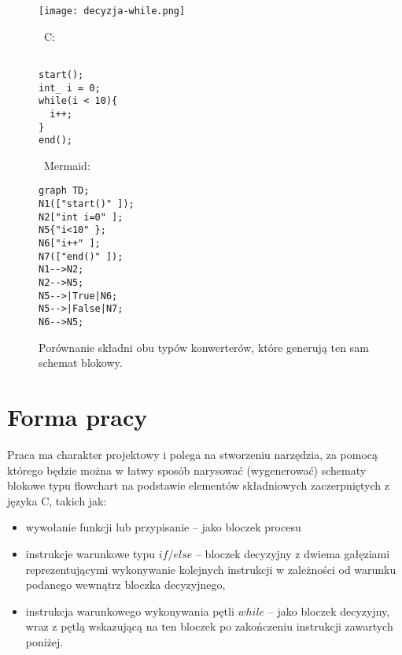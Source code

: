 \begin{figure}[h]
    \centering
\begin{minipage}[b]{.33\textwidth}
    \centering
   \texttt{[image: decyzja-while.png]}
\end{minipage}%
\hfill\vline\hfill
\hspace{0.02\linewidth}
\begin{minipage}[b]{0.3\textwidth}
    \centering 
\strut\vspace*{-\baselineskip}\newline\
C:
\begin{verbatim}
  
start();
int_ i = 0;
while(i < 10){
  i++;
}
end();
  \end{verbatim}
\end{minipage}%
\hfill\vline\hfill
\hspace{0.02\linewidth}
\begin{minipage}[b]{0.3\textwidth}
    \centering
    \strut\vspace*{-\baselineskip}\newline\
    Mermaid:
  	\begin{verbatim}
graph TD;
N1(["start()" ]);
N2["int i=0" ];
N5{"i<10" };
N6["i++" ];
N7(["end()" ]);
N1-->N2;
N2-->N5;
N5-->|True|N6;
N5-->|False|N7;
N6-->N5;
  	\end{verbatim}

    \end{minipage}
    \label{fig:prob3}
    \caption{Porównanie składni obu typów konwerterów, które generują ten sam schemat blokowy.}
\end{figure}
	

	
\section{Forma pracy}
	Praca ma charakter projektowy i polega na stworzeniu narzędzia, za pomocą którego będzie można w łatwy sposób narysować (wygenerować) schematy blokowe typu flowchart na podstawie elementów składniowych zaczerpniętych z języka C, takich jak:

\begin{itemize}
	\item {
		wywołanie funkcji lub przypisanie -- jako bloczek procesu
	}
	\item instrukcje warunkowe typu $if / else$ -- bloczek decyzyjny z dwiema gałęziami reprezentującymi wykonywanie kolejnych instrukcji w zależności od warunku podanego wewnątrz bloczka decyzyjnego,
	\item  instrukcja warunkowego wykonywania pętli $while$ -- jako bloczek decyzyjny, wraz z pętlą wskazującą na ten bloczek po zakończeniu instrukcji zawartych poniżej.
\end{itemize}

